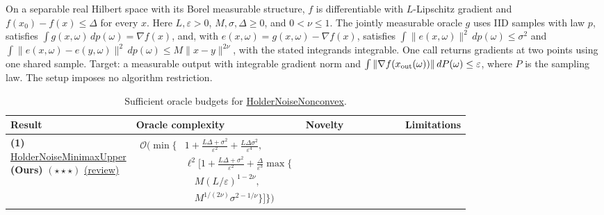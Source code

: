 \begin{table}[tp]
\centering
\caption{Sufficient oracle budgets for \href{https://github.com/k3nfalt/longtails/blob/main/LongTails/Setups/HolderNoiseNonconvex.lean}{HolderNoiseNonconvex}.}\label{tab:HolderNoiseNonconvex}
\parbox{\linewidth}{\footnotesize On a separable real Hilbert space with its Borel measurable structure, $f$ is differentiable with $L$-Lipschitz gradient and $f(x_0)-f(x)\le\Delta$ for every $x$. Here $L,\varepsilon>0$, $M,\sigma,\Delta\ge0$, and $0<\nu\le1$. The jointly measurable oracle $g$ uses IID samples with law $p$, satisfies $\int g(x,\omega)\,dp(\omega)=\nabla f(x)$, and, with $e(x,\omega)=g(x,\omega)-\nabla f(x)$, satisfies $\int\|e(x,\omega)\|^2\,dp(\omega)\le\sigma^2$ and $\int\|e(x,\omega)-e(y,\omega)\|^2\,dp(\omega)\le M\|x-y\|^{2\nu}$, with the stated integrands integrable. One call returns gradients at two points using one shared sample. Target: a measurable output with integrable gradient norm and $\int\|\nabla f(x_{\rm out}(\omega))\|\,dP(\omega)\le\varepsilon$, where $P$ is the sampling law. The setup imposes no algorithm restriction.}\par\smallskip
\begin{threeparttable}
\footnotesize
\setlength{\tabcolsep}{4pt}\renewcommand{\arraystretch}{1.25}
\begin{tabularx}{\linewidth}{@{}>{\raggedright\arraybackslash}p{0.20\linewidth}>{\raggedright\arraybackslash}p{0.32\linewidth}>{\raggedright\arraybackslash}p{0.25\linewidth}>{\raggedright\arraybackslash}X@{}}
\toprule
\textbf{Result} & \textbf{Oracle complexity} & \textbf{Novelty} & \textbf{Limitations} \\
\midrule
\textbf{(1)} \href{https://github.com/k3nfalt/longtails/blob/main/LongTails/Theorems/HolderNoiseMinimaxUpper.lean}{Holder\allowbreak Noise\allowbreak Minimax\allowbreak Upper} \textbf{(Ours)} $(\star\star\star)$ \href{https://github.com/k3nfalt/longtails/blob/main/scripts/reviews/HolderNoiseMinimaxUpper.md}{(review)}
& $\begin{aligned}
\mathcal{O}\Big(\min\Big\{&1+\frac{L\Delta+\sigma^2}{\varepsilon^2}+\frac{L\Delta\sigma^2}{\varepsilon^4},\\
&\ell^2\Big[1+\frac{L\Delta+\sigma^2}{\varepsilon^2}+\frac{\Delta}{\varepsilon^3}\max\Big\{\\
&\quad M(L/\varepsilon)^{1-2\nu},\\
&\quad M^{1/(2\nu)}\sigma^{2-1/\nu}\Big\}\Big]\Big\}\Big)
\end{aligned}$ & & \\

\end{tabularx}
\end{threeparttable}
\end{table}
